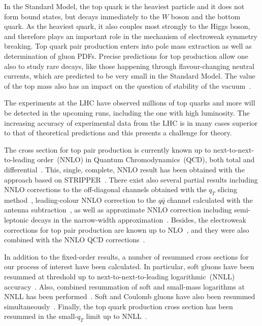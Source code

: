 \documentclass[a4paper,11pt]{article}
\newcommand{\qqbar}{{\ensuremath{q \bar q}}\xspace}
\numberwithin{equation}{section}
\begin{document}
In the Standard Model, the top quark is the heaviest particle and it does not
form bound states, but decays immediately to the $W$ boson and the bottom quark. 
%
As the heaviest quark, it also couples most strongly to the Higgs boson, and
therefore plays an important role in the mechanism of electroweak symmetry
breaking.
%
Top quark pair production enters into pole mass extraction
as well as determination of gluon PDFs. Precise predictions for top production
allow one also to study rare decays, like those happening through
flavour-changing neutral currents, which are predicted to be very small in the
Standard Model. The value of the top mass also has an impact on 
the question of stability of the vacuum~\cite{Buttazzo:2013uya}.


The experiments at the LHC have observed millions of top
quarks and more will be detected in the upcoming runs, including the one
with high luminosity.
%
The increasing accuracy of experimental data from the LHC is in many
cases superior to that of theoretical predictions and this presents a challenge
for theory.

The cross section for top pair production is currently known up to
next-to-next-to-leading order~(NNLO) in Quantum Chromodynamics~(QCD), both total
and differential~\cite{Czakon:2012pz, Czakon:2012zr,
Czakon:2013goa, Czakon:2015owf, Czakon:2016ckf}. 
%
This, single, complete, NNLO result has been obtained with the
approach based on STRIPPER~\cite{Czakon:2010td, Czakon:2011ve, Czakon:2014oma}.
%
There exist also several partial results including NNLO corrections to the
off-diagonal channels obtained with the $q_T$ slicing
method~\cite{Bonciani:2015sha}, leading-colour NNLO correction to the \qqbar
channel calculated with the antenna subtraction~\cite{Abelof:2015lna}, as well as
approximate NNLO correction including semi-leptonic decays in the narrow-width
approximation~\cite{Broggio:2014yca}.
%
Besides, the electroweak corrections for top pair production are known up to
NLO~\cite{Beenakker:1993yr,  Bernreuther:2006vg}, and they were also combined
with the NNLO QCD corrections~\cite{Czakon:2017wor}.

In addition to the fixed-order results, a number of resummed cross sections for
our process of interest have been calculated. In particular, soft
gluons have been resummed at threshold up to next-to-next-to-leading
logarithmic~(NNLL) accuracy~\cite{Czakon:2009zw, Beneke:2009rj, Ahrens:2010zv,
Kidonakis:2010dk, Cacciari:2011hy}. Also, combined resummation of soft and
small-mass logarithms at NNLL has been
performed~\cite{Pecjak:2016nee, Czakon:2018nun}.  Soft and Coulomb gluons have
also been resummed simultaneously~\cite{Piclum:2018ndt}.
%
Finally, the top quark production cross section has been resummed in the
small-$q_T$ limit up to NNLL~\cite{Li:2013mia, Catani:2014qha, Catani:2018mei}.
\end{document}
